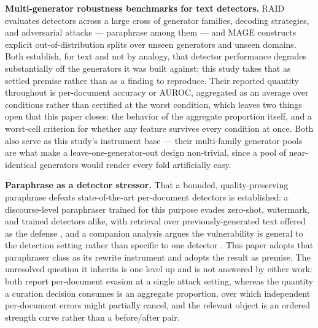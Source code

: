 \documentclass[11pt]{article}
\begin{document}
\textbf{Multi-generator robustness benchmarks for text detectors.} RAID \citep{RAID2024Benchmark} evaluates detectors across a large cross of generator families, decoding strategies, and adversarial attacks --- paraphrase among them --- and MAGE \citep{MAGE2024InTheWild} constructs explicit out-of-distribution splits over unseen generators and unseen domains. Both establish, for text and not by analogy, that detector performance degrades substantially off the generators it was built against; this study takes that as settled premise rather than as a finding to reproduce. Their reported quantity throughout is per-document accuracy or AUROC, aggregated as an average over conditions rather than certified at the worst condition, which leaves two things open that this paper closes: the behavior of the aggregate proportion itself, and a worst-cell criterion for whether any feature survives every condition at once. Both also serve as this study's instrument base --- their multi-family generator pools are what make a leave-one-generator-out design non-trivial, since a pool of near-identical generators would render every fold artificially easy.

\textbf{Paraphrase as a detector stressor.} That a bounded, quality-preserving paraphrase defeats state-of-the-art per-document detectors is established: a discourse-level paraphraser trained for this purpose evades zero-shot, watermark, and trained detectors alike, with retrieval over previously-generated text offered as the defense \citep{DipperParaphrase2023}, and a companion analysis argues the vulnerability is general to the detection setting rather than specific to one detector \citep{ReliablyDetectable2023}. This paper adopts that paraphraser class as its rewrite instrument and adopts the result as premise. The unresolved question it inherits is one level up and is not answered by either work: both report per-document evasion at a single attack setting, whereas the quantity a curation decision consumes is an aggregate proportion, over which independent per-document errors might partially cancel, and the relevant object is an ordered strength curve rather than a before/after pair.
\end{document}
